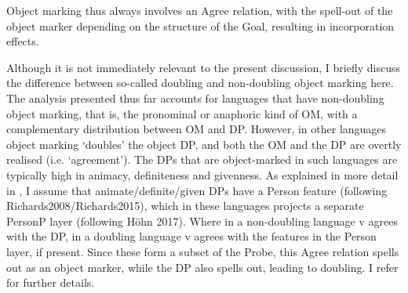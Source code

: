 \documentclass[output=paper
,modfonts
,nonflat]{langsci/langscibook}
\begin{document}
\begin{exe} 
\ex	{} 
	\xlist
	\endxlist
\end{exe} 

Object marking thus always involves an Agree relation, with the spell-out of the object marker depending on the structure of the Goal, resulting in incorporation effects.

Although it is not immediately relevant to the present discussion, I briefly discuss the difference between so-called doubling and non-doubling object marking here. The analysis presented thus far accounts for languages that have non-doubling object marking, that is, the pronominal or anaphoric kind of OM, with a complementary distribution between OM and DP. However, in other languages object marking ‘doubles’ the object DP, and both the OM and the DP are overtly realised (i.e. ‘agreement’). The DPs that are object-marked in such languages are typically high in animacy, definiteness and givenness. As explained in more detail in \citet{Van_der_Wal2015}, I assume that animate/definite/given DPs have a Person feature (following Richards2008/Richards2015), %
which in these languages projects a separate PersonP layer (following Höhn 2017). %
Where in a non-doubling language v agrees with the DP, in a doubling language v agrees with the features in the Person layer, if present. Since these form a subset of the Probe, this Agree relation spells out as an object marker, while the DP also spells out, leading to doubling. I refer \citet{Van_der_Wal2015} for further details.
 
\end{document}
